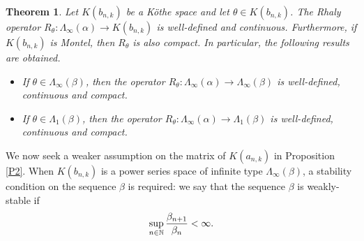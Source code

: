 \documentclass{birkjour}
\newtheorem{thm}{Theorem}[section]
\theoremstyle{definition}
\theoremstyle{remark}
\numberwithin{equation}{section}
\begin{document}
\begin{thm}\label{Thm1}  Let $K(b_{n,k})
$ be a Köthe space and let $\theta\in K(b_{n,k})$.  The Rhaly operator $R_{\theta}: \Lambda_{\infty}(\alpha) \to K(b_{n,k})$ is well-defined and continuous. Furthermore, if $K(b_{n,k})$ is Montel, then $R_{\theta}$ is also compact. In particular, the following results are obtained.
\begin{itemize}
\item[1.] If $\theta\in \Lambda_{\infty}(\beta)$, then the operator $R_{\theta}:\Lambda_{\infty}( \alpha)\to \Lambda_{\infty}(\beta)$ is well-defined, continuous and compact. 
\item[2.] If $\theta\in \Lambda_{1}(\beta)$, then the operator $R_{\theta}:\Lambda_{\infty}(\alpha)\to \Lambda_{1}(\beta)$ is well-defined, continuous and compact. 
\end{itemize}
\end{thm}

We now seek a weaker assumption on the matrix 
of $K(a_{n,k})$ in Proposition \ref{P2}. When $K(b_{n,k})$ is a power series space of infinite type $\Lambda_{\infty}(\beta)$, a stability condition on the sequence $\beta$ is required: we say that the sequence $\beta$ is weakly-stable if
$$
\sup_{n\in \mathbb{N}} {\beta_{n+1}\over \beta_{n}}<\infty.$$
\end{document}
